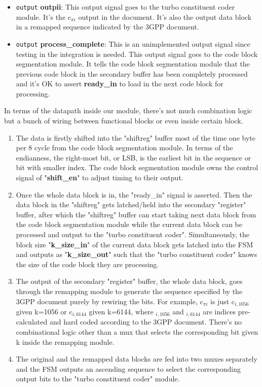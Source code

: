\documentclass[letterpaper, 12pt]{article} %
\begin{document}
\begin{itemize}
    \item \texttt{output} {\bf outpii}: This output signal goes to the turbo constituent coder module. It's the c$_{\pi i}$ output in the document. It's also the output data block in a remapped sequence indicated by the 3GPP document.
    \item \texttt{output} {\bf process\_complete}: This is an unimplemented output signal since testing in the integration is needed. This output signal goes to the code block segmentation module. It tells the code block segmentation module that the previous code block in the secondary buffer has been completely processed and it's OK to assert {\bf ready\_in} to load in the next code block for processing.
\end{itemize}

In terms of the datapath inside our module, there's not much combination logic but a bunch of wiring between functional blocks or even inside certain block.

\begin{enumerate}
    \item The data is firstly shifted into the "shiftreg" buffer most of the time one byte per 8 cycle from the code block segmentation module. In terms of the endianness, the right-most bit, or LSB, is the earliest bit in the sequence or bit with smaller index. The code block segmentation module owns the control signal of "{\bf shift\_en}" to adjust timing to their output.
    \item Once the whole data block is in, the "ready\_in" signal is asserted. Then the data block in the "shiftreg" gets latched/held into the secondary "register" buffer, after which the "shiftreg" buffer can start taking next data block from the code block segmentation module while the current data block can be processed and output to the "turbo constituent coder". Simultaneously, the block size "{\bf k\_size\_in}" of the current data block gets latched into the FSM and outputs as "{\bf k\_size\_out}" such that the "turbo constituent coder" knows the size of the code block they are processing.
    \item The output of the secondary "register" buffer, the whole data block, goes through the remapping module to generate the sequence specified by the 3GPP document purely by rewiring the bits. For example, c$_{\pi i}$ is just c$_{i,1056}$ given k=1056 or c$_{i,6144}$ given k=6144, where $_{i,1056}$ and $_{i,6144}$ are indices pre-calculated and hard coded according to the 3GPP document. There's no combinational logic other than a mux that selects the corresponding bit given k inside the remapping module.
    \item The original and the remapped data blocks are fed into two muxes separately and the FSM outputs an ascending sequence to select the corresponding output bits to the "turbo constituent coder" module.
\end{enumerate}
\end{document}
